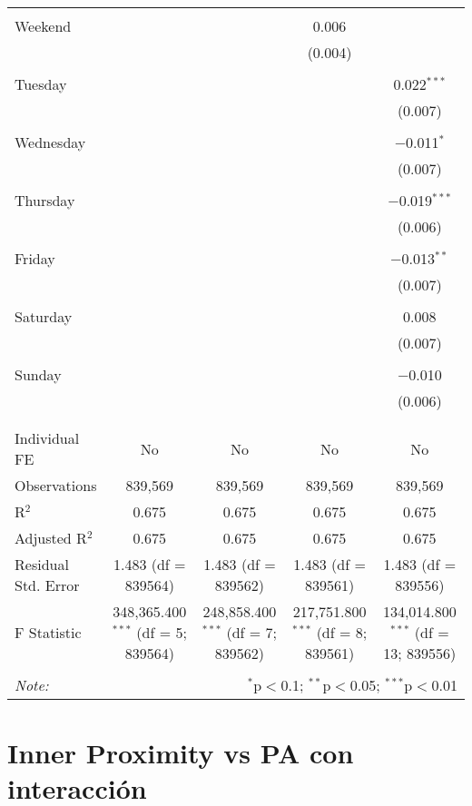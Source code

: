 \documentclass[
]{article}
\begin{document}
\begin{table}[!htbp]
{\begin{tabular}{@{\extracolsep{5pt}}lcccc}
  & & & & \\ 
 Weekend &  &  & 0.006 &  \\ 
  &  &  & (0.004) &  \\ 
  & & & & \\ 
 Tuesday &  &  &  & 0.022$^{***}$ \\ 
  &  &  &  & (0.007) \\ 
  & & & & \\ 
 Wednesday &  &  &  & $-$0.011$^{*}$ \\ 
  &  &  &  & (0.007) \\ 
  & & & & \\ 
 Thursday &  &  &  & $-$0.019$^{***}$ \\ 
  &  &  &  & (0.006) \\ 
  & & & & \\ 
 Friday &  &  &  & $-$0.013$^{**}$ \\ 
  &  &  &  & (0.007) \\ 
  & & & & \\ 
 Saturday &  &  &  & 0.008 \\ 
  &  &  &  & (0.007) \\ 
  & & & & \\ 
 Sunday &  &  &  & $-$0.010 \\ 
  &  &  &  & (0.006) \\ 
  & & & & \\ 
\hline \\[-1.8ex] 
Individual FE & No & No & No & No \\ 
Observations & 839,569 & 839,569 & 839,569 & 839,569 \\ 
R$^{2}$ & 0.675 & 0.675 & 0.675 & 0.675 \\ 
Adjusted R$^{2}$ & 0.675 & 0.675 & 0.675 & 0.675 \\ 
Residual Std. Error & 1.483 (df = 839564) & 1.483 (df = 839562) & 1.483 (df = 839561) & 1.483 (df = 839556) \\ 
F Statistic & 348,365.400$^{***}$ (df = 5; 839564) & 248,858.400$^{***}$ (df = 7; 839562) & 217,751.800$^{***}$ (df = 8; 839561) & 134,014.800$^{***}$ (df = 13; 839556) \\ 
\hline 
\hline \\[-1.8ex] 
\textit{Note:}  & \multicolumn{4}{r}{$^{*}$p$<$0.1; $^{**}$p$<$0.05; $^{***}$p$<$0.01} \\ 
\end{tabular}
} 
\end{table} 
\newpage
\section{Inner Proximity vs PA con interacción}
\end{document}
